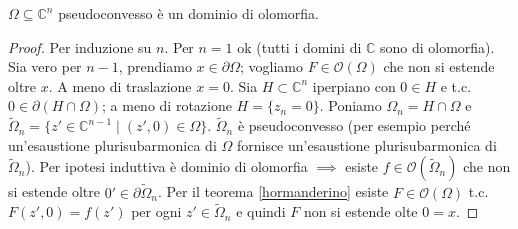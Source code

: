 \begin{cor}
  $\Omega \subseteq \mathbb{C}^n$ pseudoconvesso è un dominio di olomorfia.
\end{cor}

\begin{proof}
  Per induzione su $n$. Per $n=1$ ok (tutti i domini di $\mathbb{C}$ sono di olomorfia). Sia vero per $n-1$, prendiamo $x \in \partial\Omega$; vogliamo $F \in \mathcal{O}(\Omega)$ che non si estende oltre $x$. A meno di traslazione $x=0$. Sia $H \subset \mathbb{C}^n$ iperpiano con $0 \in H$ e t.c. $0 \in \partial(H\cap\Omega)$; a meno di rotazione $H=\{z_n=0\}$.
  Poniamo $\Omega_n=H\cap\Omega$ e $\tilde{\Omega}_n=\{z' \in \mathbb{C}^{n-1} \mid (z',0) \in \Omega\}$. $\tilde{\Omega}_n$ è pseudoconvesso (per esempio perché un'esaustione plurisubarmonica di $\Omega$ fornisce un'esaustione plurisubarmonica di $\tilde{\Omega}_n$). Per ipotesi induttiva è dominio di olomorfia $\implies$ esiste $f \in \mathcal{O}(\tilde{\Omega}_n)$ che non si estende oltre $0' \in \partial\tilde{\Omega}_n$.
  Per il teorema \ref{hormanderino} esiste $F \in \mathcal{O}(\Omega)$ t.c. $F(z',0)=f(z')$ per ogni $z' \in \tilde{\Omega}_n$ e quindi $F$ non si estende olte $0=x$.
\end{proof}

